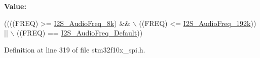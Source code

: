 {\bfseries Value\+:}
\begin{DoxyCode}
((((FREQ) >= \hyperlink{group___i2_s___audio___frequency_ga7868ac234485a80d45586dd87cd00043}{I2S\_AudioFreq\_8k}) && \(\backslash\)
                                  ((FREQ) <= \hyperlink{group___i2_s___audio___frequency_gadfdaed9a2acb71f2cdd737be81a6f747}{I2S\_AudioFreq\_192k})) || \(\backslash\)
                                 ((FREQ) == \hyperlink{group___i2_s___audio___frequency_ga30f78e8214e8a91cdb6d6360c1d3f18d}{I2S\_AudioFreq\_Default}))
\end{DoxyCode}


Definition at line 319 of file stm32f10x\+\_\+spi.\+h.

